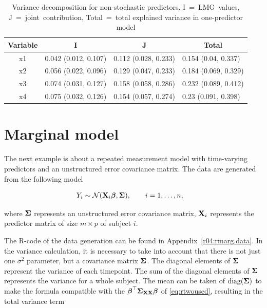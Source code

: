 \documentclass[11pt,a4paper,twoside]{book}\usepackage[]{graphicx}\usepackage[]{color}
\begin{document}
\begin{table}[h]
\caption{Variance decomposition for non-stochastic predictors. I~=~LMG~values,   J~=~joint~contribution, Total~=~total explained variance in one-predictor model}
\centering
\begin{tabular}{clll}
  \toprule
  \multicolumn{1}{c}{\textbf{Variable}} & \multicolumn{1}{c}{\textbf{I}} &\multicolumn{1}{c}{\textbf{J}} & \multicolumn{1}{c}{\textbf{Total}} \\
  \hline
x1 & 0.042 (0.012, 0.107)  & 0.112 (0.028, 0.233)   & 0.154 (0.04, 0.337)  \\ 
x2 & 0.056 (0.022, 0.096)  & 0.129 (0.047, 0.233)   & 0.184 (0.069, 0.329)  \\ 
x3 & 0.074 (0.031, 0.127)  & 0.158 (0.058, 0.286)   & 0.232 (0.089, 0.412)  \\ 
x4 & 0.075 (0.032, 0.126)  & 0.154 (0.057, 0.274)   & 0.23 (0.091, 0.398)  \\ 
   \bottomrule
\end{tabular}
\label{tbl:repeatedcormod.tot}
\end{table}



\section{Marginal  model}

The next example is about a repeated measurement model with time-varying predictors and an unstructured error covariance matrix. The data are generated from the following model

\begin{align} 
&Y_{i} \sim \mathcal{N}({\mathbf{X}}_{i} {\boldsymbol{\beta}}, {\boldsymbol{\Sigma}}{}), \qquad i = 1, \dots, n ,
\end{align} 

where ${\boldsymbol{\Sigma}}{}$ represents an unstructured error covariance matrix, ${\mathbf{X}}_{i}$ represents the predictor matrix of size $m \times p$ of subject $i$.

The R-code of the data generation can be found in Appendix~\ref{r04:rmarg.data}. In the variance calculation, it is necessary to take into account that there is not just one $\sigma^2$ parameter, but a covariance matrix ${\boldsymbol{\Sigma}}{}$. The diagonal elements of ${\boldsymbol{\Sigma}}{}$ represent the variance of each timepoint. The sum of the diagonal elements of ${\boldsymbol{\Sigma}}{}$ represents the variance for a whole subject. The mean can be taken of $\operatorname{diag}({\boldsymbol{\Sigma}}{})$ to make the formula compatible with the ${\boldsymbol{\beta}}^\top {\boldsymbol{\Sigma}}{}_{{\mathbf{X}} {\mathbf{X}}}  {\boldsymbol{\beta}}$ of \eqref{eq:rtwoused}, resulting in the total variance term
\end{document}
